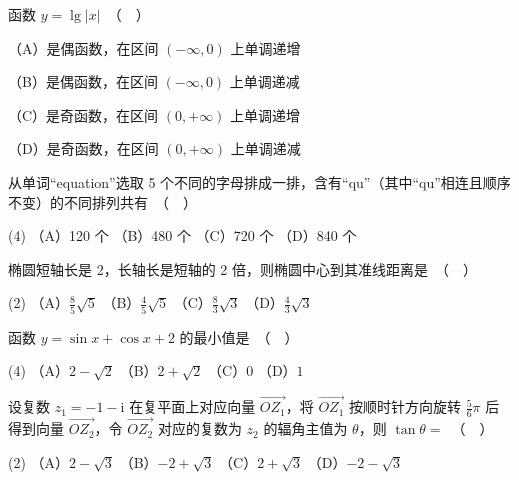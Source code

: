 \begin{question}
函数 $y = \lg |x|$　（　）

（A）是偶函数，在区间 $(-\infty, 0)$ 上单调递增

（B）是偶函数，在区间 $(-\infty, 0)$ 上单调递减

（C）是奇函数，在区间 $(0, +\infty)$ 上单调递增

（D）是奇函数，在区间 $(0, +\infty)$ 上单调递减

\end{question}
\begin{question}
从单词“equation”选取 5 个不同的字母排成一排，含有“qu”（其中“qu”相连且顺序不变）的不同排列共有　（　）

\begin{gkopts}(4)
\task （A）120 个
\task （B）480 个
\task （C）720 个
\task （D）840 个
\end{gkopts}

\end{question}
\begin{question}
椭圆短轴长是 2，长轴长是短轴的 2 倍，则椭圆中心到其准线距离是　（　）

\begin{gkopts}(2)
\task （A）$\frac{8}{5}\sqrt{5}$
\task （B）$\frac{4}{5}\sqrt{5}$
\task （C）$\frac{8}{3}\sqrt{3}$
\task （D）$\frac{4}{3}\sqrt{3}$
\end{gkopts}

\end{question}
\begin{question}
函数 $y = \sin x + \cos x + 2$ 的最小值是　（　）

\begin{gkopts}(4)
\task （A）$2 - \sqrt{2}$
\task （B）$2 + \sqrt{2}$
\task （C）$0$
\task （D）$1$
\end{gkopts}

\end{question}
\begin{question}
设复数 $z_1 = -1 - \mathrm{i}$ 在复平面上对应向量 $\overrightarrow{OZ_1}$，将 $\overrightarrow{OZ_1}$ 按顺时针方向旋转 $\frac{5}{6}\pi$ 后得到向量 $\overrightarrow{OZ_2}$，令 $\overrightarrow{OZ_2}$ 对应的复数为 $z_2$ 的辐角主值为 $\theta$，则 $\tan\theta =$　（　）

\begin{gkopts}(2)
\task （A）$2 - \sqrt{3}$
\task （B）$-2 + \sqrt{3}$
\task （C）$2 + \sqrt{3}$
\task （D）$-2 - \sqrt{3}$
\end{gkopts}

\end{question}
